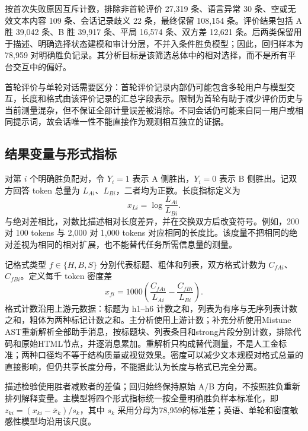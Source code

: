 \documentclass[UTF8,11pt,a4paper,fontset=windows]{ctexart}
\numberwithin{equation}{section}
\begin{document}
按首次失败原因互斥计数，排除非首轮评价 27,319 条、语言异常 30 条、空或无效文本内容 109 条、会话记录歧义 22 条，最终保留 108,154 条。评价结果包括 A 胜 39,042 条、B 胜 39,917 条、平局 16,574 条、双方差 12,621 条。后两类保留用于描述、明确选择状态建模和审计分层，不并入条件胜负模型；因此，回归样本为 78,959 对明确胜负记录。其分析目标是该筛选总体中的相对选择，而不是所有平台交互中的偏好。

首轮评价与单轮对话需要区分：首轮评价记录内部仍可能包含多轮用户与模型交互，长度和格式由该评价记录的汇总字段表示。限制为首轮有助于减少评价历史与当前测量混杂，但不保证全部计量误差被消除。不同会话仍可能来自同一用户或相同提示词，故会话唯一性不能直接作为观测相互独立的证据。

\subsection{结果变量与形式指标}
对第 $i$ 个明确胜负配对，令 $Y_i=1$ 表示 A 侧胜出，$Y_i=0$ 表示 B 侧胜出。记双方回答 token 总量为 $L_{Ai}$、$L_{Bi}$，二者均为正数。长度指标定义为
\begin{equation}
 x_{Li}=\log\frac{L_{Ai}}{L_{Bi}}.
\end{equation}
与绝对差相比，对数比描述相对长度差异，并在交换双方后改变符号。例如，200 对 100 tokens 与 2,000 对 1,000 tokens 对应相同的长度比。该度量不把相同的绝对差视为相同的相对扩展，也不能替代任务所需信息量的测量。

记格式类型 $f\in\{H,B,S\}$ 分别代表标题、粗体和列表，双方格式计数为 $C_{fAi}$、$C_{fBi}$。定义每千 token 密度差
\begin{equation}
 x_{fi}=1000\left(\frac{C_{fAi}}{L_{Ai}}-\frac{C_{fBi}}{L_{Bi}}\right).
\end{equation}
格式计数沿用上游元数据：标题为 h1--h6 计数之和，列表为有序与无序列表计数之和，粗体为两种标记计数之和。主分析使用上游计数；补充分析使用Mistune AST重新解析全部助手消息，按标题块、列表条目和strong片段分别计数，排除代码和原始HTML节点，并逐消息累加。重解析只构成替代测量，不是人工金标准；两种口径均不等于结构质量或视觉效果。密度可以减少文本规模对格式总量的直接影响，但仍共享长度分母，不能据此认为长度与格式已完全分离。

描述检验使用胜者减败者的差值；回归始终保持原始 A/B 方向，不按照胜负重新排列解释变量。主模型将四个形式指标统一按全量明确胜负样本标准化，即 $z_{ki}=(x_{ki}-\bar x_k)/s_k$，其中 $s_k$ 采用分母为78,959的标准差；英语、单轮和密度敏感性模型均沿用该尺度。
\end{document}
